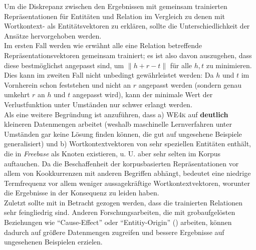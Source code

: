 Um die Diskrepanz zwischen den Ergebnissen mit gemeinsam trainierten Repräsentationen für Entitäten und Relation im Vergleich
zu denen mit Wortkontext- als Entitätsvektoren zu erklären, sollte die Unterschiedlichkeit der Ansätze hervorgehoben
werden.\\
Im ersten Fall werden wie erwähnt alle eine Relation betreffende Repräsentationsvektoren gemeinsam trainiert; es ist
also davon auszugehen, dass diese bestmöglichst angepasst sind, um $\parallel h + r - t\parallel$ für alle $h, t$ zu minimieren.\\
Dies kann im zweiten Fall nicht unbedingt gewährleistet werden: Da $h$ und $t$ im Vornherein schon feststehen und nicht
an $r$ angepasst werden (sondern genau umkehrt $r$ an $h$ und $t$ angepasst wird), kann der minimale Wert der Verlustfunktion
unter Umständen nur schwer erlangt werden.\\
Als eine weitere Begründung ist anzuführen, dass a) \textsc{WE4k} auf \textbf{deutlich} kleineren Datenmengen arbeitet (weshalb maschinelle
Lernverfahren unter Umständen gar keine Lösung finden können, die gut auf ungesehene Beispiele generalisiert) und b)
Wortkontextvektoren von sehr speziellen Entitäten enthält, die in \emph{Freebase} als Knoten existieren, u. U. aber sehr selten
im Korpus auftauchen. Da die Beschaffenheit der korpusbasierten Repräsentationen vor allem von Kookkurrenzen mit anderen
Begriffen abhängt, bedeutet eine niedrige Termfrequenz vor allem weniger aussagekräftige Wortkontextvektoren, worunter die
Ergebnisse in der Konsequenz zu leiden haben.\\
Zuletzt sollte mit in Betracht gezogen werden, dass die trainierten Relationen sehr feingliedrig sind. Anderen Forschungsarbeiten,
 die mit grobaufgelösten Beziehungen wie ``Cause-Effect'' oder ``Entitiy-Origin''
(\cite{hendrickx2009semeval}) arbeiten, können dadurch auf größere Datenmengen zugreifen und bessere Ergebnisse auf
ungesehenen Beispielen erzielen.
